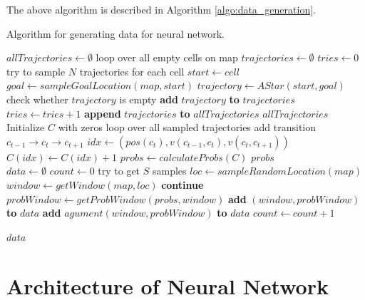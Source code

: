 The above algorithm is described in Algorithm \ref{algo:data_generation}. 

\begin{algorithm}
\caption{Algorithm for generating data for neural network.}
\label{algo:data_generation}
\begin{algorithmic}[1]
\State $allTrajectories \gets \emptyset$
    \Comment loop over all empty cells on map
	\State $trajectories \gets \emptyset $
	\State $tries \gets 0$
	\Comment try to sample $N$ trajectories for each cell
	\State $start \gets cell$
	\State $goal \gets sampleGoalLocation(map, start)$
	\State $trajectory \gets AStar(start, goal)$
		\Comment check whether $trajectory$ is empty
		\State \textbf{add} $trajectory$ \textbf{to} $trajectories$
	\EndIf
	\State $tries \gets tries+1$
	\EndWhile
	\State \textbf{append} $trajectories$ \textbf{to} $allTrajectories$
\EndFor
\State \Return $allTrajectories$
\EndProcedure
\\
\State Initialize $C$ with zeros
    \Comment loop over all sampled trajectories
    \Comment add transition $c_{t-1} \rightarrow c_t \rightarrow c_{t+1}$
	\State  $idx \gets (pos(c_t), v(c_{t-1}, c_t), v(c_t, c_{t+1}))$
	\State $C(idx) \gets C(idx)+1$ 
    \EndFor
\EndFor
\State $probs \gets calculateProbs(C)$
\State \Return $probs$
\EndProcedure
\\
\State $data \gets \emptyset$ 
\State $count \gets 0$
	\Comment try to get $S$ samples
    \State $loc \gets sampleRandomLocation(map)$
    \State $window \gets getWindow(map, loc)$
    	\State \textbf{continue}
    \EndIf
    \State $probWindow \gets getProbWindow(probs, window)$
    \State \textbf{add} $(window, probWindow)$ \textbf{to} $data$
    \State \textbf{add} $agument(window, probWindow)$ \textbf{to} $data$
    \State $count \gets count+1$
\EndWhile

\State \Return $data$
\EndProcedure
\end{algorithmic}
\end{algorithm}

\section{Architecture of Neural Network} \label{sec:training}

